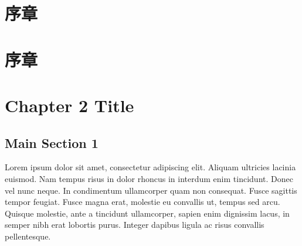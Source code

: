 \documentclass[
  letterpaper,
  11pt,
  english,
  singlespacing,
  headsepline,
  fontsize=10.5pt,
  oneside]{MastersDoctoralThesis}
\begin{document}





\dedicatory{} 



\mainmatter %

\pagestyle{thesis} %
\newcommand{\keyword}[1]{\textbf{#1}}
\newcommand{\tabhead}[1]{\textbf{#1}}
\newcommand{\code}[1]{\texttt{#1}}
\newcommand{\file}[1]{\texttt{\bfseries#1}}
\newcommand{\option}[1]{\texttt{\itshape#1}}



\chapter{序章}\label{sec-Chapter1}


\chapter{序章}\label{sec-Chapter1}


\chapter{Chapter 2 Title}\label{sec-Chapter2}

\section{Main Section 1}\label{main-section-1}

Lorem ipsum dolor sit amet, consectetur adipiscing elit. Aliquam
ultricies lacinia euismod. Nam tempus risus in dolor rhoncus in interdum
enim tincidunt. Donec vel nunc neque. In condimentum ullamcorper quam
non consequat. Fusce sagittis tempor feugiat. Fusce magna erat, molestie
eu convallis ut, tempus sed arcu. Quisque molestie, ante a tincidunt
ullamcorper, sapien enim dignissim lacus, in semper nibh erat lobortis
purus. Integer dapibus ligula ac risus convallis pellentesque.
\end{document}
